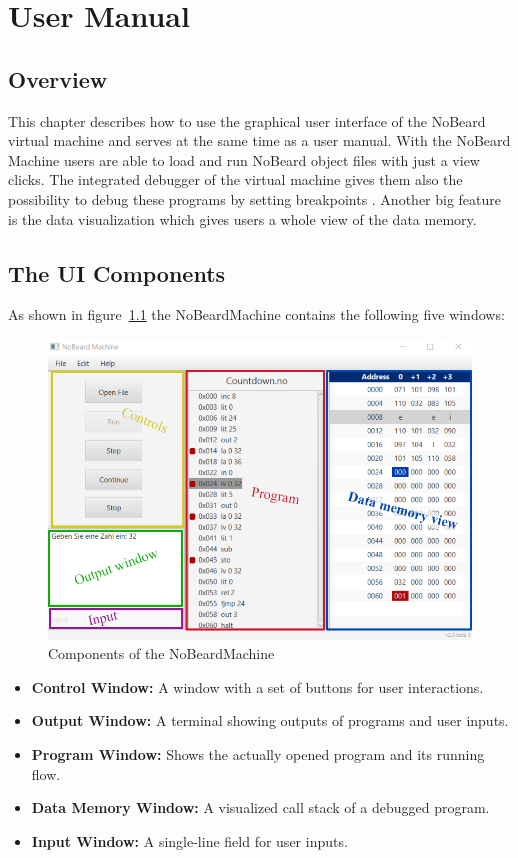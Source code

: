\chapter{User Manual}
\lstset{language=NoBeardAsm}
\section{Overview}
This chapter describes how to use the graphical user interface of the NoBeard virtual machine and serves at the same time as a user manual.
With the NoBeard Machine users are able to load and run NoBeard object files with just a view clicks. The integrated debugger of the virtual machine gives them also the possibility to debug these programs by setting breakpoints . Another big feature is the data visualization which gives users a whole view of the data memory.
\section{The UI Components}
As shown in figure~\ref{fig:components} the NoBeardMachine contains the following five windows:

\begin{figure}[h] 
	\centering
	\includegraphics[scale=.87]{images/screenshot-0.png}
	\caption{Components of the NoBeardMachine}
	\label{fig:components}
\end{figure}

\begin{itemize}
\item \textbf{Control Window: }A window with a set of buttons for user interactions.
\item \textbf{Output Window: }A terminal showing outputs of programs and user inputs.
\item \textbf{Program Window: }Shows the actually opened program and its running flow.
\item \textbf{Data Memory Window: }A visualized call stack of a debugged program.
\item \textbf{Input Window: }A single-line field for user inputs.
\end{itemize}

